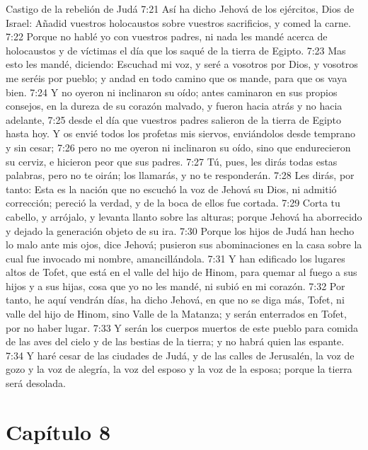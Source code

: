 Castigo de la rebelión de Judá 
7:21 Así ha dicho Jehová de los ejércitos, Dios de Israel: Añadid vuestros holocaustos sobre vuestros sacrificios, y comed la carne. 
7:22 Porque no hablé yo con vuestros padres, ni nada les mandé acerca de holocaustos y de víctimas el día que los saqué de la tierra de Egipto. 
7:23 Mas esto les mandé, diciendo: Escuchad mi voz, y seré a vosotros por Dios, y vosotros me seréis por pueblo; y andad en todo camino que os mande, para que os vaya bien. 
7:24 Y no oyeron ni inclinaron su oído; antes caminaron en sus propios consejos, en la dureza de su corazón malvado, y fueron hacia atrás y no hacia adelante, 
7:25 desde el día que vuestros padres salieron de la tierra de Egipto hasta hoy. Y os envié todos los profetas mis siervos, enviándolos desde temprano y sin cesar; 
7:26 pero no me oyeron ni inclinaron su oído, sino que endurecieron su cerviz, e hicieron peor que sus padres. 
7:27 Tú, pues, les dirás todas estas palabras, pero no te oirán; los llamarás, y no te responderán. 
7:28 Les dirás, por tanto: Esta es la nación que no escuchó la voz de Jehová su Dios, ni admitió corrección; pereció la verdad, y de la boca de ellos fue cortada. 
7:29 Corta tu cabello, y arrójalo, y levanta llanto sobre las alturas; porque Jehová ha aborrecido y dejado la generación objeto de su ira. 
7:30 Porque los hijos de Judá han hecho lo malo ante mis ojos, dice Jehová; pusieron sus abominaciones en la casa sobre la cual fue invocado mi nombre, amancillándola. 
7:31 Y han edificado los lugares altos de Tofet, que está en el valle del hijo de Hinom,  para quemar al fuego a sus hijos y a sus hijas, cosa que yo no les mandé, ni subió en mi corazón. 
7:32 Por tanto, he aquí vendrán días, ha dicho Jehová, en que no se diga más, Tofet, ni valle del hijo de Hinom, sino Valle de la Matanza; y serán enterrados en Tofet, por no haber lugar. 
7:33 Y serán los cuerpos muertos de este pueblo para comida de las aves del cielo y de las bestias de la tierra; y no habrá quien las espante. 
7:34 Y haré cesar de las ciudades de Judá, y de las calles de Jerusalén, la voz de gozo y la voz de alegría, la voz del esposo y la voz de la esposa; porque la tierra será desolada. 
\section*{Capítulo 8 }
 
